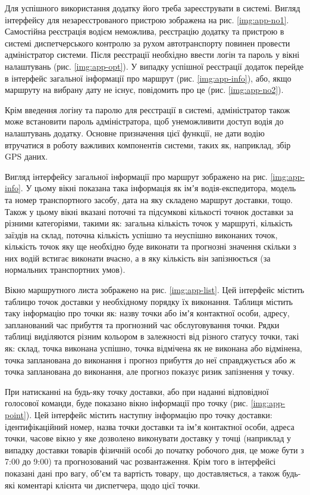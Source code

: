 Для успішного використання додатку його треба зареєструвати в системі. Вигляд інтерфейсу для незареєстрованого пристрою зображена на рис. \ref{img:app-no1}. Самостійна реєстрація водієм неможлива, реєстрацію додатку та пристрою в системі диспетчерського контролю за рухом автотранспорту повинен провести адміністратор системи. Після реєстрації необхідно ввести логін та пароль у вікні налаштувань (рис. \ref{img:app-opt}). У випадку успішної реєстрації додаток перейде в інтерфейс загальної інформації про маршрут (рис. \ref{img:app-info}), або, якщо маршруту на вибрану дату не існує, повідомить про це (рис. \ref{img:app-no2}).

Крім введення логіну та паролю для реєстрації в системі, адміністратор також може встановити пароль адміністратора, щоб унеможливити доступ водія до налаштувань додатку. Основне призначення цієї функції, не дати водію втручатися в роботу важливих компонентів системи, таких як, наприклад, збір GPS даних. 

Вигляд інтерфейсу загальної інформації про маршрут зображено на рис. \ref{img:app-info}. У цьому вікні показана така інформація як імʼя водія-експедитора, модель та номер транспортного засобу, дата на яку складено маршрут доставки, тощо. Також у цьому вікні вказані поточні та підсумкові кількості точнок доставки за різними категоріями, такими як: загальна кількість точок у маршруті, кількість заїздів на склад, поточна кількість успішно та неуспішно виконаних точок, кількість точок яку ще необхідно буде виконати та прогнозні значення скільки з них водій встигає виконати вчасно, а в яку кількість він запізнюється (за нормальних транспортних умов).

Вікно маршрутного листа зображено на рис. \ref{img:app-list}. Цей інтерфейс містить таблицю точок доставки у необхідному порядку їх виконання. Таблиця містить таку інформацію про точки як: назву точки або імʼя контактної особи, адресу, запланований час прибуття та прогнозний час обслуговування точки. Рядки таблиці виділяются різним кольором в залежності від різного статусу точки, такі як: склад, точка виконана успішно, точка відмічена як не виконана або відмінена, точка запланована до виконання і прогноз прибуття до неї справджується або ж точка запланована до виконання, але прогноз показує ризик запізнення у точку.

При натисканні на будь-яку точку доставки, або при наданні відповідної голосової команди, буде показано вікно інформації про точку (рис. \ref{img:app-point}). Цей інтерфейс містить наступну інформацію про точку доставки: ідентифікаційний номер, назва точки доставки та імʼя контактної особи, адреса точки, часове вікно у яке дозволено виконувати доставку у точці (наприклад у випадку доставки товарів фізичній особі до початку робочого дня, це може бути з 7:00 до 9:00) та прогнозований час розвантаження. Крім того в інтерфейсі показані дані про вагу, обʼєм та вартість товару, що доставляється, а також будь-які коментарі клієнта чи диспетчера, щодо цієї точки.

